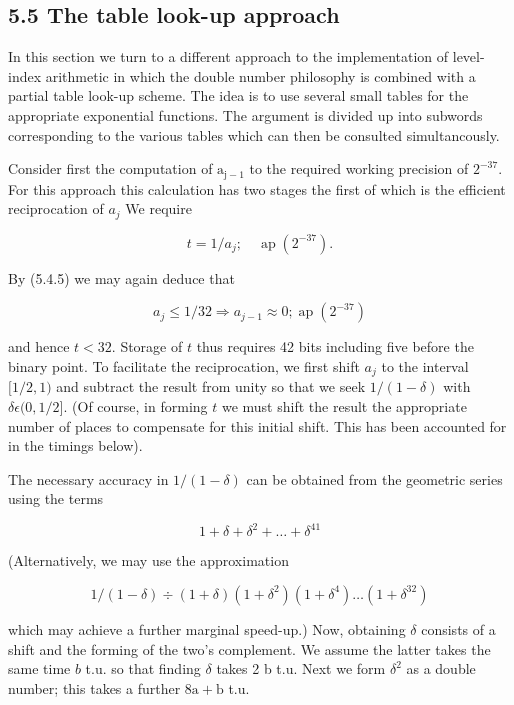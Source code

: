 \documentclass[10pt]{article}
\begin{document}
\subsection*{5.5 The table look-up approach}
In this section we turn to a different approach to the implementation of level-index arithmetic in which the double number philosophy is combined with a partial table look-up scheme. The idea is to use several small tables for the appropriate exponential functions. The argument is divided up into subwords corresponding to the various tables which can then be consulted simultancously.

Consider first the computation of $\mathrm{a}_{\mathrm{j}-1}$ to the required working precision of $2^{-37}$. For this approach this calculation has two stages the first of which is the efficient reciprocation of $a_{j}$ We require


\begin{equation*}
t=1 / a_{j} ; \quad \operatorname{ap}\left(2^{-37}\right) . \tag{5.5.1}
\end{equation*}


By (5.4.5) we may again deduce that

$$
a_{j} \leqslant 1 / 32 \Rightarrow a_{j-1} \approx 0 ; \operatorname{ap}\left(2^{-37}\right)
$$

and hence $t<32$. Storage of $t$ thus requires 42 bits including five before the binary point. To facilitate the reciprocation, we first shift $a_{j}$ to the interval $[1 / 2,1)$ and subtract the result from unity so that we seek $1 /(1-\delta)$ with $\delta \epsilon(0,1 / 2]$. (Of course, in forming $t$ we must shift the result the appropriate number of places to compensate for this initial shift. This has been accounted for in the timings below).

The necessary accuracy in $1 /(1-\delta)$ can be obtained from the geometric series using the terms

$$
1+\delta+\delta^{2}+\ldots+\delta^{41}
$$

(Alternatively, we may use the approximation

$$
1 /(1-\delta) \div(1+\delta)\left(1+\delta^{2}\right)\left(1+\delta^{4}\right) \ldots\left(1+\delta^{32}\right)
$$

which may achieve a further marginal speed-up.) Now, obtaining $\delta$ consists of a shift and the forming of the two's complement. We assume the latter takes the same time $b$ t.u. so that finding $\delta$ takes 2 b t.u. Next we form $\delta^{2}$ as a double number; this takes a further $8 \mathrm{a}+\mathrm{b}$ t.u.
\end{document}
